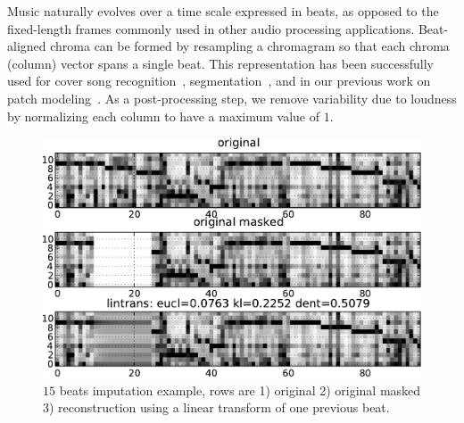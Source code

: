 \documentclass{article}
\begin{document}
Music naturally evolves over a time scale expressed in beats, as
opposed to the fixed-length frames commonly used in other audio
processing applications.  Beat-aligned chroma can be formed by
resampling a chromagram so that each chroma (column) vector spans a
single beat.  This representation has been successfully used for cover
song recognition~\cite{Ellis2007a}, segmentation~\cite{Weiss2010}, and
in our previous work on patch modeling~\cite{Bertin-Mahieux2010a}.  As
a post-processing step, we remove variability due to loudness by
normalizing each column to have a maximum value of $1$.





\begin{figure}[t]
\begin{center}
\includegraphics[width=.95\columnwidth]{basic}
\end{center}
\caption{$15$ beats imputation example, rows are 1) original 2) original masked
3) reconstruction using a linear transform of one previous beat.
\label{fig:basic}}
\end{figure}
\end{document}
